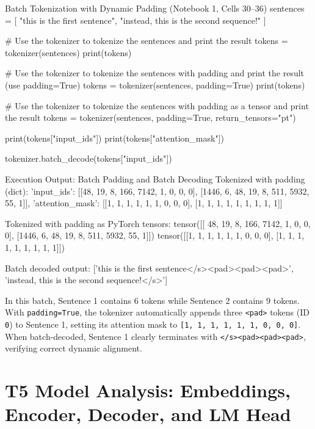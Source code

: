 \documentclass[11pt,a4paper]{article}
\begin{document}
\begin{solutioncode}[label=lst:batch_padding_solution]{Batch Tokenization with Dynamic Padding (Notebook 1, Cells 30--36)}
sentences = [
    "this is the first sentence",
    "instead, this is the second sequence!"
]

# Use the tokenizer to tokenize the sentences and print the result
tokens = tokenizer(sentences)
print(tokens)

# Use the tokenizer to tokenize the sentences with padding and print the result (use padding=True)
tokens = tokenizer(sentences, padding=True)
print(tokens)

# Use the tokenizer to tokenize the sentences with padding as a tensor and print the result
tokens = tokenizer(sentences, padding=True, return_tensors="pt")

print(tokens["input_ids"])
print(tokens["attention_mask"])

tokenizer.batch_decode(tokens["input_ids"])
\end{solutioncode}

\begin{macterminal}{Execution Output: Batch Padding and Batch Decoding}
Tokenized with padding (dict):
{'input_ids': [[48, 19, 8, 166, 7142, 1, 0, 0, 0], [1446, 6, 48, 19, 8, 511, 5932, 55, 1]], 'attention_mask': [[1, 1, 1, 1, 1, 1, 0, 0, 0], [1, 1, 1, 1, 1, 1, 1, 1, 1]]}

Tokenized with padding as PyTorch tensors:
tensor([[  48,   19,    8,  166, 7142,    1,    0,    0,    0],
        [1446,    6,   48,   19,    8,  511, 5932,   55,    1]])
tensor([[1, 1, 1, 1, 1, 1, 0, 0, 0],
        [1, 1, 1, 1, 1, 1, 1, 1, 1]])

Batch decoded output:
['this is the first sentence</s><pad><pad><pad>',
 'instead, this is the second sequence!</s>']
\end{macterminal}

In this batch, Sentence 1 contains 6 tokens while Sentence 2 contains 9 tokens. With \texttt{padding=True}, the tokenizer automatically appends three \texttt{<pad>} tokens (ID \texttt{0}) to Sentence 1, setting its attention mask to \texttt{[1, 1, 1, 1, 1, 1, 0, 0, 0]}. When batch-decoded, Sentence 1 clearly terminates with \texttt{</s><pad><pad><pad>}, verifying correct dynamic alignment.


\section{T5 Model Analysis: Embeddings, Encoder, Decoder, and LM Head}
\end{document}
